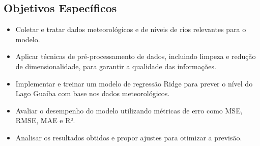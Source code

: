 \subsection{Objetivos Específicos}

\begin{itemize}
    \item Coletar e tratar dados meteorológicos e de níveis de rios relevantes para o modelo.
    \item Aplicar técnicas de pré-processamento de dados, incluindo limpeza e redução de dimensionalidade, para garantir a qualidade das informações.
    \item Implementar e treinar um modelo de regressão Ridge para prever o nível do Lago Guaíba com base nos dados meteorológicos.
    \item Avaliar o desempenho do modelo utilizando métricas de erro como MSE, RMSE, MAE e R².
    \item Analisar os resultados obtidos e propor ajustes para otimizar a previsão.
\end{itemize}